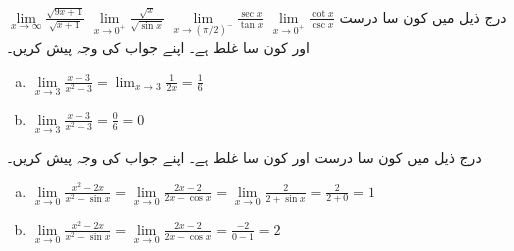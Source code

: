$\lim\limits_{x\to \infty}\frac{\sqrt{9x+1}}{\sqrt{x+1}}$
$\lim\limits_{x\to 0^+}\frac{\sqrt{x}}{\sqrt{\sin x}}$
$\lim\limits_{x\to (\pi/2)^-}\frac{\sec x}{\tan x}$
$\lim\limits_{x\to 0^+}\frac{\cot x}{\csc x}$
درج ذیل میں کون سا درست اور کون سا غلط ہے۔ اپنے جواب کی وجہ پیش کریں۔
\begin{enumerate}[a.]
\item
$\lim\limits_{x\to 3}\frac{x-3}{x^2-3}=\lim_{x\to3}\frac{1}{2x}=\frac{1}{6}$
\item
$\lim\limits_{x\to 3}\frac{x-3}{x^2-3}=\frac{0}{6}=0$
\end{enumerate}
درج ذیل میں کون سا درست اور کون سا غلط ہے۔ اپنے جواب کی وجہ پیش کریں۔
\begin{enumerate}[a.]
\item
$\lim\limits_{x\to 0}\frac{x^2-2x}{x^2-\sin x}=\lim\limits_{x\to 0}\frac{2x-2}{2x-\cos x}=\lim\limits_{x\to0}\frac{2}{2+\sin x}=\frac{2}{2+0}=1$
\item
$\lim\limits_{x\to 0}\frac{x^2-2x}{x^2-\sin x}=\lim\limits_{x\to 0}\frac{2x-2}{2x-\cos x}=\frac{-2}{0-1}=2$
\end{enumerate}

